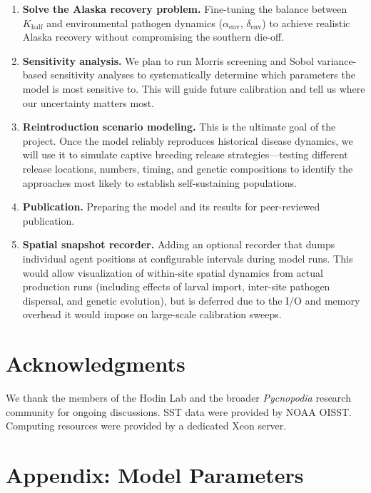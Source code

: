 \documentclass[11pt]{article}
\begin{document}
\begin{enumerate}[leftmargin=2em]
    \item \textbf{Solve the Alaska recovery problem.} Fine-tuning the balance between $K_{\text{half}}$ and environmental pathogen dynamics ($\alpha_{\text{env}}$, $\delta_{\text{env}}$) to achieve realistic Alaska recovery without compromising the southern die-off.

    \item \textbf{Sensitivity analysis.} We plan to run Morris screening and Sobol variance-based sensitivity analyses to systematically determine which parameters the model is most sensitive to. This will guide future calibration and tell us where our uncertainty matters most.

    \item \textbf{Reintroduction scenario modeling.} This is the ultimate goal of the project. Once the model reliably reproduces historical disease dynamics, we will use it to simulate captive breeding release strategies---testing different release locations, numbers, timing, and genetic compositions to identify the approaches most likely to establish self-sustaining populations.

    \item \textbf{Publication.} Preparing the model and its results for peer-reviewed publication.

    \item \textbf{Spatial snapshot recorder.} Adding an optional recorder that dumps individual agent positions at configurable intervals during model runs. This would allow visualization of within-site spatial dynamics from actual production runs (including effects of larval import, inter-site pathogen dispersal, and genetic evolution), but is deferred due to the I/O and memory overhead it would impose on large-scale calibration sweeps.
\end{enumerate}

\section*{Acknowledgments}

We thank the members of the Hodin Lab and the broader \textit{Pycnopodia} research community for ongoing discussions. SST data were provided by NOAA OISST. Computing resources were provided by a dedicated Xeon server.



\clearpage
\section*{Appendix: Model Parameters}
\end{document}
